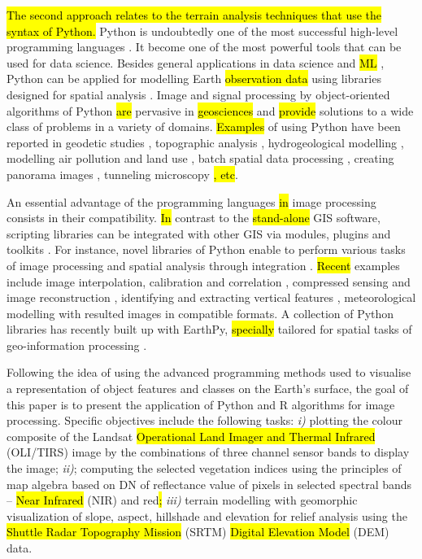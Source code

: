 \documentclass[jimaging,article,submit,pdftex,moreauthors]{Definitions/mdpi}
\begin{document}
\hl{The second approach relates to the terrain analysis techniques that use the syntax of Python.} Python is undoubtedly one of the most successful high-level programming languages \cite{van1995python}. It become one of the most powerful tools that can be used for data science. Besides general applications in data science and \hl{ML} \cite{8757088,DebeirDecaestecker,Debeir2008,9719489}, Python can be applied for modelling Earth \hl{observation data} using libraries\hl{ }designed for spatial analysis \cite{Ahmed}. Image and signal processing by object-oriented algorithms of Python \hl{are} pervasive in \hl{geosciences} and \hl{provide} solutions to a wide class of problems in a variety of domains. \hl{Examples} of using Python have been reported in geodetic studies \cite{Zhou2021GPS2spaceAO}, topographic analysis \cite{9254627}, hydrogeological modelling \cite{Mogaji}, modelling air pollution and land use \cite{Maetal2020}, batch spatial data processing \cite{6057428}, creating panorama images \cite{JASKOLKA2019e02560},\hl{ }tunneling microscopy \cite{BASTIDAS2021150821}\hl{, etc}. 

An essential advantage of the programming languages \hl{in} image processing consists in their compatibility. \hl{In} contrast to the \hl{stand-alone} GIS software, scripting libraries can be integrated with other GIS via modules, plugins and toolkits \cite{6407912,7378577,VOS2019104528}. For instance, novel libraries of Python enable to perform various tasks of image processing and spatial analysis through integration \cite{1247428,Rey2010PySALAP,Rey2010}. \hl{Recent} examples include\hl{ }image interpolation, calibration and correlation \cite{DEDEUSFILHO2022101131}, compressed sensing and image reconstruction \cite{FARRENS2020100402}, identifying and extracting\hl{ }vertical features \cite{GAO2022105503}, meteorological modelling \cite{6528254} with resulted images in compatible formats. A collection of Python libraries \cite{ROBERTS2022105192,CHEN2022105362} has recently built up with EarthPy, \hl{specially} tailored for spatial tasks of geo-information\hl{ }processing \cite{wasser2019EarthPyAP}.  

Following the idea of using the advanced programming methods used to visualise a representation of object features and classes on the Earth's surface, the goal of this paper is to present the application of Python and R algorithms for image processing. Specific objectives include the following tasks: \emph{i)} plotting the colour composite of the Landsat \hl{Operational Land Imager and Thermal Infrared} (OLI/TIRS) image by the combinations of three channel sensor bands to display the image; \emph{ii)}; computing the selected vegetation indices using the principles of map algebra based on DN of reflectance value of pixels in selected spectral bands -- \hl{Near Infrared} (NIR) and red\hl{;} \emph{iii)} terrain modelling with geomorphic visualization of slope, aspect, hillshade and elevation for\hl{ }relief analysis using the \hl{Shuttle Radar Topography Mission} (SRTM) \hl{Digital Elevation Model} (DEM) data. 
\end{document}
